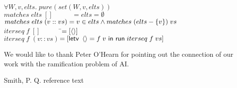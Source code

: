 \documentclass[preprint,natbib]{sigplanconf}
\begin{document}
\begin{tabbing}
$\forall W, v, elts.\; pure(set(W,v,elts))$ \\[1em]
  

$matches\;elts\;[] \qquad\;\;\; = elts = \emptyset$ \\
$matches\;elts\;(v :: vs) = v \in elts \land matches\;(elts - \{{v}\})\;vs$\\[1em]

$iterseq\; f\; [] \qquad\;\;\;\;$\=$= [\left<\right>]$ \\
$iterseq\; f\; (v :: vs)$\>$= [\mbox{\textsf{{letv }}}\left<\right> = f\;v\mbox{\textsf{{ in }}}\mbox{\textsf{{run}}}\;iterseq\;f\;vs]$ \\
\end{tabbing}


\acks

We would like to thank Peter O'Hearn for pointing out the connection
of our work with the ramification problem of AI.



\begin{thebibliography}{}

Smith, P. Q. reference text

\end{thebibliography}
\end{document}
